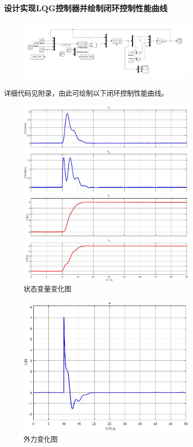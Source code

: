 \documentclass[UTF8]{ctexart}
\begin{document}
  \subsubsection{设计实现LQG控制器并绘制闭环控制性能曲线}
  \begin{figure}
  \centering
  \includegraphics[width=0.8\textwidth]{figures/simulink.png}
  \end{figure}
详细代码见附录，由此可绘制以下闭环控制性能曲线。
\begin{figure}
\centering
\includegraphics[width=0.8\textwidth]{figures/result.jpg}
\caption{状态变量变化图}
\end{figure}
\begin{figure}
  \centering
  \includegraphics[width=0.8\textwidth]{figures/result2.jpg}
  \caption{外力变化图}
  \label{fig:force}
  \end{figure}
\end{document}
